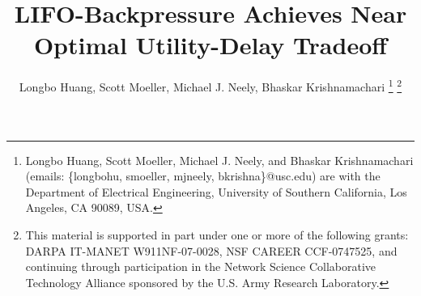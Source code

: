 \documentclass[journal]{IEEEtran}
\begin{document}
\title{LIFO-Backpressure Achieves Near Optimal Utility-Delay Tradeoff}


\author{\large{Longbo Huang, Scott Moeller, Michael J. Neely, Bhaskar Krishnamachari}%
\thanks{Longbo Huang, Scott Moeller, Michael J. Neely, and Bhaskar Krishnamachari   (emails: \{longbohu, smoeller, mjneely, bkrishna\}@usc.edu)
are with the Department of Electrical
Engineering, University of Southern California, Los Angeles, CA 90089, USA.}
\thanks{This material is supported in part  under one or more of 
the following grants: DARPA IT-MANET 
W911NF-07-0028, 
NSF CAREER CCF-0747525, and continuing through participation in the 
Network Science Collaborative Technology Alliance sponsored
by the U.S. Army Research Laboratory.} }
\maketitle

\thispagestyle{empty}
\newtheorem{rem}{Remark}
\newtheorem{fact_def}{\textbf{Fact}}
\newtheorem{coro}{\textbf{Corollary}}
\newtheorem{lemma}{\textbf{Lemma}}
\newtheorem{main}{\textbf{Proposition}}
\newtheorem{thm}{\textbf{Theorem}}
\newtheorem{claim}{\emph{Claim}}
\newtheorem{prop}{Proposition}
\newtheorem{assumption}{\textbf{Assumption}}
\end{document}
